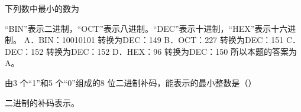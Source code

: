 \question 下列数中最小的数为
\par{}
\begin{solution}``BIN''表示二进制，``OCT''表示八进制。``DEC''表示十进制，``HEX''表示十六进制。
A．BIN：10010101 转换为DEC：149 B．OCT：227 转换为DEC：151 C．DEC：152
转换为DEC：152 D．HEX：96 转换为DEC：150 所以本题的答案为A。
\end{solution}
\question 由3 个``1''和5 个``0''组成的8 位二进制补码，能表示的最小整数是（）
\par{}
\begin{solution}二进制的补码表示。
\end{solution}
